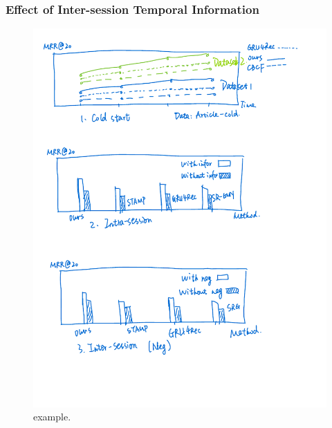 \subsubsection{Effect of Inter-session Temporal Information}
\begin{figure}[th]
  \centering
  \includegraphics[width=0.9\columnwidth]{fig/ablation.pdf}
  \caption{example.}
  \label{fig:ablation}
\end{figure}
